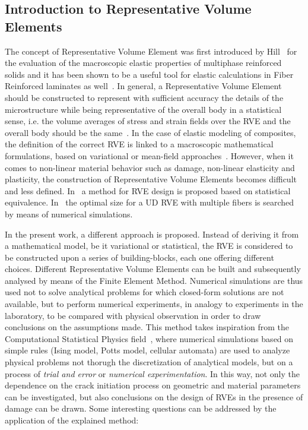 \documentclass[a4paper]{jpconf}
\begin{document}
\subsection{Introduction to Representative Volume Elements}\label{sub:introRVE}
The concept of Representative Volume Element was first introduced by Hill~\cite{Hill:1963} for the evaluation of the macroscopic elastic properties of multiphase reinforced solids and it has been shown to be a useful tool for elastic calculations in Fiber Reinforced laminates as well~\cite{SunVaidya:1996}. In general, a Representative Volume Element should be constructed to represent with sufficient accuracy the details of the microstructure while being representative of the overall body in a statistical sense, i.e. the volume averages of stress and strain fields over the RVE and the overall body should be the same~\cite{Hashin:1983}. In the case of elastic modeling of composites, the definition of the correct RVE is linked to a macroscopic mathematical formulations, based on variational or mean-field approaches~\cite{Hashin:1962,Hashin:1963}. However, when it comes to non-linear material behavior such as damage, non-linear elasticity and plasticity, the construction of Representative Volume Elements becomes difficult and less defined. In~\cite{SwaminathanGhoshPagano:2006,SwaminathanGhosh:2006} a method for RVE design is proposed based on statistical equivalence. In~\cite{BulsaraTalrejaQu:1999} the optimal size for a UD RVE with multiple fibers is searched by means of numerical simulations.\par
In the present work, a different approach is proposed. Instead of deriving it from a mathematical model, be it variational or statistical, the RVE is considered to be constructed upon a series of building-blocks, each one offering different choices. Different Representative Volume Elements can be built and subsequently analysed by means of the Finite Element Method. Numerical simulations are thus used not to solve analytical problems for which closed-form solutions are not available, but to perform numerical experiments, in analogy to experiments in the laboratory, to be compared with physical observation in order to draw conclusions on the assumptions made. This method takes inspiration from the Computational Statistical Physics field~\cite{Krauth:2009,HoffmannSchreiber:2002}, where numerical simulations based on simple rules (Ising model, Potts model, cellular automata) are used to analyze physical problems not thorugh the discretization of analytical models, but on a process of \textit{trial and error} or \textit{numerical experimentation}. In this way, not only the dependence on the crack initiation process on geometric and material parameters can be investigated, but also conclusions on the design of RVEs in the presence of damage can be drawn. Some interesting questions can be addressed by the application of the explained method:
\end{document}
